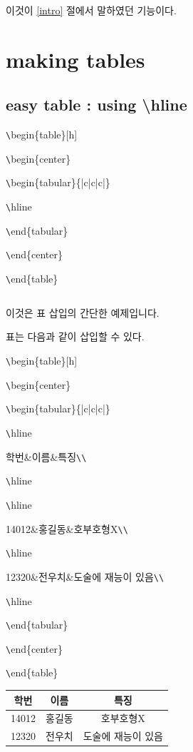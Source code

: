 \documentclass[11pt]{article}
\begin{document}
이것이 \ref{intro} 절에서 말하였던 기능이다.

\section{making tables}
\subsection{easy table : using \textbackslash hline}

\verb+\+begin\{table\}[h]

\verb+\+begin\{center\}

\verb+\+begin\{tabular\}\{|c|c|c|\}

\verb+\+hline

\verb+\+end\{tabular\}

\verb+\+end\{center\}

\verb+\+end\{table\}


\begin{table}[h]
	\begin{center}
		\begin{tabular}{|c|c|c|}
			\hline
		\end{tabular}
	\end{center}
\end{table}

이것은 표 삽입의 간단한 예제입니다.

표는 다음과 같이 삽입할 수 있다.

\verb+\+begin\{table\}[h]

\verb+\+begin\{center\}

\verb+\+begin\{tabular\}\{|c|c|c|\}

\verb+\+hline

학번\&이름\&특징\verb+\+\verb+\+

\verb+\+hline

\verb+\+hline

14012\&홍길동\&호부호형X\verb+\+\verb+\+

\verb+\+hline

12320\&전우치\&도술에 재능이 있음\verb+\+\verb+\+

\verb+\+hline

\verb+\+end\{tabular\}

\verb+\+end\{center\}

\verb+\+end\{table\}


\begin{table}[!h]
	\begin{center}
		\begin{tabular}{|c|c|c|}
			\hline
			학번&이름&특징\\
			\hline
			\hline
			14012&홍길동&호부호형X\\
			\hline
			12320&전우치&도술에 재능이 있음\\
			\hline
		\end{tabular}
	\end{center}
\end{table}
\end{document}
